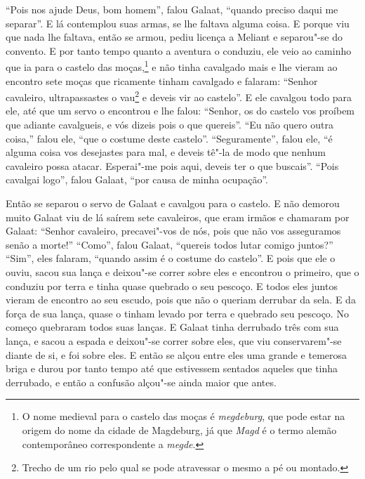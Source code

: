 “Pois nos ajude Deus, bom homem”, falou Galaat, “quando preciso daqui me
separar”. E lá contemplou suas armas, se lhe faltava alguma coisa. E porque viu
que nada lhe faltava, então se armou, pediu licença a Meliant e separou"-se do
convento. E por tanto tempo quanto a aventura o conduziu, ele veio ao caminho
que ia para o castelo das moças,\footnote{ O nome medieval para o castelo das
moças é \textit{megdeburg}, que pode estar na origem do nome da cidade de
Magdeburg, já que \textit{Magd} é o termo alemão contemporâneo
correspondente a \textit{megde}. } e não tinha cavalgado mais e lhe vieram
ao encontro sete moças que ricamente tinham cavalgado e falaram: “Senhor
cavaleiro, ultrapassastes o vau\footnote{ Trecho de um rio pelo qual se pode
atravessar o mesmo a pé ou montado.}  e deveis vir ao castelo''. E
ele cavalgou todo para ele, até que um servo o encontrou e lhe falou: “Senhor,
os do castelo vos proíbem que adiante cavalgueis, e vós dizeis pois o que
quereis”. “Eu não quero outra coisa,'' falou ele, “que o costume deste
castelo”. “Seguramente”, falou ele, “é alguma coisa vos desejastes para mal, e
deveis tê"-la de modo que nenhum cavaleiro possa atacar. Esperai"-me pois aqui,
deveis ter o que buscais”. “Pois cavalgai logo”, falou Galaat, “por causa de
minha ocupação”.

Então se separou o servo de Galaat e cavalgou para o castelo. E não demorou
muito Galaat viu de lá saírem sete cavaleiros, que eram irmãos e chamaram por
Galaat: “Senhor cavaleiro, precavei"-vos de nós, pois que não vos asseguramos
senão a morte!” “Como”, falou Galaat, “quereis todos lutar comigo juntos?”
“Sim”, eles falaram, “quando assim é o costume do castelo”. E pois que ele o
ouviu, sacou sua lança e deixou"-se correr sobre eles e encontrou o primeiro,
que o conduziu por terra e tinha quase quebrado o seu pescoço. E todos eles
juntos vieram de encontro ao seu escudo, pois que não o queriam derrubar da
sela. E da força de sua lança, quase o tinham levado por terra e quebrado seu
pescoço. No começo quebraram todos suas lanças. E Galaat tinha derrubado três
com sua lança, e sacou a espada e deixou"-se correr sobre eles, que viu
conservarem"-se diante de si, e foi sobre eles. E então se alçou entre eles uma
grande e temerosa briga e durou por tanto tempo até que estivessem sentados
aqueles que tinha derrubado, e então a confusão alçou"-se ainda maior que antes.


